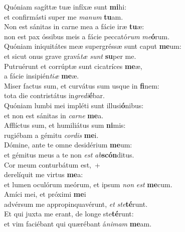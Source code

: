 \evenverse Quóniam sagíttæ tuæ infíxæ sunt \textbf{mi}hi:~\*\\
\evenverse et confirmásti super me \textit{ma}\textit{num} \textbf{tu}am.\\
\oddverse Non est sánitas in carne mea a fácie iræ \textbf{tu}æ:~\*\\
\oddverse non est pax óssibus meis a fácie peccató\textit{rum} \textit{me}\textbf{ó}rum.\\
\evenverse Quóniam iniquitátes meæ supergréssæ sunt caput \textbf{me}um:~\*\\
\evenverse et sicut onus grave gravá\textit{tæ} \textit{sunt} \textbf{su}per me.\\
\oddverse Putruérunt et corrúptæ sunt cicatríces \textbf{me}æ,~\*\\
\oddverse a fácie insipién\textit{ti}\textit{æ} \textbf{me}æ.\\
\evenverse Miser factus sum, et curvátus sum usque in \textbf{fi}nem:~\*\\
\evenverse tota die contristátus in\textit{gre}\textit{di}\textbf{é}bar.\\
\oddverse Quóniam lumbi mei impléti sunt illusi\textbf{ó}nibus:~\*\\
\oddverse et non est sánitas in \textit{car}\textit{ne} \textbf{me}a.\\
\evenverse Afflíctus sum, et humiliátus sum \textbf{ni}mis:~\*\\
\evenverse rugiébam a gémitu \textit{cor}\textit{dis} \textbf{me}i.\\
\oddverse Dómine, ante te omne desidérium \textbf{me}um:~\*\\
\oddverse et gémitus meus a te non \textit{est} \textit{ab}\textbf{scón}ditus.\\
\evenverse Cor meum conturbátum est,~+\\
\evenverse  derelíquit me virtus \textbf{me}a:~\*\\
\evenverse et lumen oculórum meórum, et ipsum \textit{non} \textit{est} \textbf{me}cum.\\
\oddverse Amíci mei, et próximi \textbf{me}i~\*\\
\oddverse advérsum me appropinquavérunt, \textit{et} \textit{ste}\textbf{té}runt.\\
\evenverse Et qui juxta me erant, de longe ste\textbf{té}runt:~\*\\
\evenverse et vim faciébant qui quærébant á\textit{ni}\textit{mam} \textbf{me}am.\\
